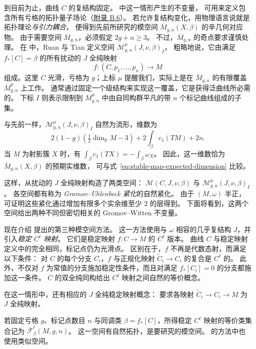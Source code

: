 到目前为止，曲线 $C$ 的复结构固定。 中这一情形产生的不变量，
可用来定义包含所有亏格的拓扑量子场论（\hyperref[sec:topological-qft]{附录 B.6}）。
若允许复结构变化，用物理语言说就是拓扑理论\emph{与引力耦合}，
便得到先前所研究的模空间 $\overline M_{g,n}(X,\beta)$ 的辛几何对应物。
由于需要空间 $\overline M_{g,n}$，必须假定 $2g+n\geq3$。
不过，$\overline M_{g,n}$ 的奇点要求谨慎处理。
在  中，Ruan 与 Tian 定义空间 $\mathcal M^\mu_{g,n}(J,\nu,\beta)_I$，
粗略地说，它由满足 $f_*[C]=\beta$ 的所有扰动的 $J$ 全纯映射
\[
f:(C,p_1,\ldots,p_n)\longrightarrow M
\]
组成。这里 $C$ 光滑，亏格为 $g$；上标 $\mu$ 提醒我们，实际上是在
$\overline M_{g,n}$ 的有限覆盖 $\overline M^\mu_{g,n}$ 上工作。
通常通过固定一个级结构来实现这一覆盖，它是获得泛曲线所必需的。
下标 $I$ 则表示限制到 $\overline M^\mu_{g,n}$ 中由自同构群平凡的带 $n$ 个标记曲线组成的子集。

与先前一样，$\mathcal M^\mu_{g,n}(J,\nu,\beta)_I$ 自然为流形，维数为
\begin{equation}\label{eq:varying-curve-map-index}
2(1-g)\left(\tfrac12\dim_{\mathbb R}M-3\right)
+2\int_\beta c_1(TM)+2n.
\end{equation}
当 $M$ 为射影簇 $X$ 时，有 $\int_\beta c_1(TX)=-\int_\beta\omega_X$。
因此，这一维数恰为 $\overline M_{g,n}(X,\beta)$ 的预期实维数，
可与式~\eqref{eq:stable-map-expected-dimension} 比较。

这样，从扰动的 $J$ 全纯映射构造了两类空间：
$\mathcal M(C,J,\nu,\beta)$ 与 $\mathcal M^\mu_{g,n}(J,\nu,\beta)_I$。
各空间都有称为 \emph{Gromov--Uhlenbeck 紧化}的自然紧化。
由于 $(M,\omega)$ 半正，可证明这些紧化通过增加有限多个实余维至少 $2$ 的层得到。
下面将看到，这两个空间给出两种不同但密切相关的 Gromov--Witten 不变量。

现在介绍  提出的第三种模空间方法。
这一方法使用与 $\omega$ 相容的几乎复结构 $J$，并引入\emph{稳定 $C^\ell$ 映射}。
它们是稳定映射 $f:C\to M$ 的 $C^\ell$ 版本。
曲线 $C$ 与稳定映射定义中的完全相同，标记点仍为光滑点。
区别在于，$f$ 不再是代数态射，而满足以下条件：
对 $C$ 的每个分支 $C_i$，$f$ 与正规化映射 $\widetilde C_i\to C_i$ 的复合是 $C^\ell$ 的。
此外，不仅对 $f$ 为常值的分支施加稳定性条件，而且对满足 $f_*[C_i]=0$ 的分支都施加这一条件。
$C$ 的双全纯同构给出 $C^\ell$ 映射之间自然的等价概念。

在这一情形中，还有相应的 $J$ 全纯稳定映射概念：
要求各映射 $\widetilde C_i\to C_i\to M$ 为 $J$ 全纯映射。

若固定亏格 $g$、标记点数目 $n$ 与同调类 $\beta=f_*[C]$，所得稳定 $C^\ell$ 映射的等价类集合记为
$\overline{\mathcal F}^{\ell}_\beta(M,g,n)$。
这一空间有自然拓扑，是要研究的模空间。 的方法中也使用类似空间。

